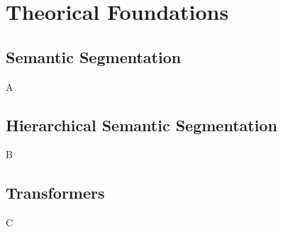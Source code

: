 \section{Theorical Foundations}

  \subsection{Semantic Segmentation}

  A
  
  \subsection{Hierarchical Semantic Segmentation}

  B

  \subsection{Transformers}

  C
